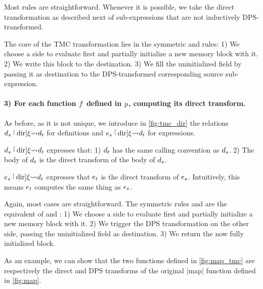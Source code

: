 Most rules are straightforward.
Whenever it is possible, we take the direct transformation as described next of sub-expressions that are not inductively DPS-transformed.

The core of the TMC transformation lies in the symmetric  and  rules:
1) We choose a side to evaluate first and partially initialize a new memory block with it.
2) We write this block to the destination.
3) We fill the uninitialized field by passing it as destination to the DPS-transformed corresponding source sub-expression.

\paragraph{3) For each function $\datalangFn$ defined in $\datalangProg$, computing its direct transform.}
As before, as it is not unique, we introduce in \cref{fig:tmc_dir} the relations $\datalangDef_s \tmcDir{\datalangRenaming} \datalangDef_t$ for definitions and $\datalangExpr_s \tmcDir{\datalangRenaming} \datalangDef_t$ for expressions.

$\datalangDef_s \tmcDir{\datalangRenaming} \datalangDef_t$ expresses that:
1) $\datalangDef_t$ has the same calling convention as $\datalangDef_s$.
2) The body of $\datalangDef_t$ is the direct transform of the body of $\datalangDef_s$.

$\datalangExpr_s \tmcDir{\datalangRenaming} \datalangDef_t$ expresses that $\datalangExpr_t$ is the direct transform of $\datalangExpr_s$.
Intuitively, this means $\datalangExpr_t$ computes the same thing as $\datalangExpr_s$.

Again, most cases are straightforward.
The symmetric rules  and  are the equivalent of  and :
1) We choose a side to evaluate first and partially initialize a new memory block with it.
2) We trigger the DPS transformation on the other side, passing the uninitialized field as destination.
3) We return the now fully initialized block.

\medskip

As an example, we can show that the two \DataLang functions defined in \cref{fig:map_tmc} are respectively the direct and DPS transforms of the original \datalang|map| function defined in \cref{fig:map}.




